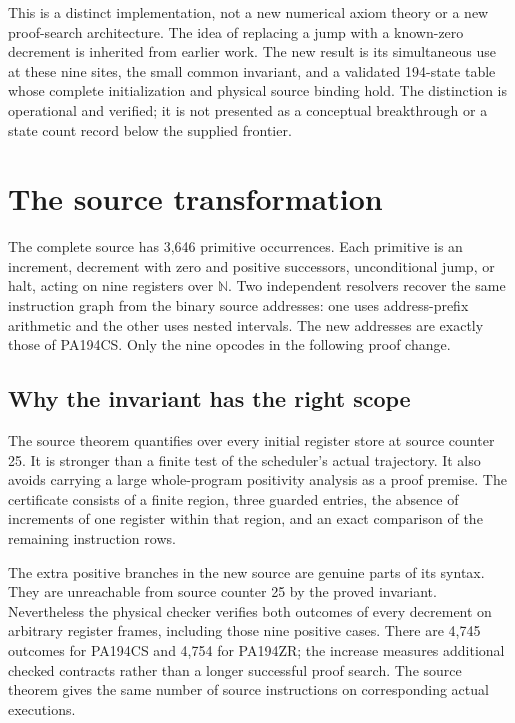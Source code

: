 \documentclass[11pt,letterpaper]{article}
\begin{document}
This is a distinct implementation, not a new numerical axiom theory or
a new proof-search architecture. The idea of replacing a jump with a
known-zero decrement is inherited from earlier work. The new result is
its simultaneous use at these nine sites, the small common invariant,
and a validated 194-state table whose complete initialization and
physical source binding hold. The distinction is operational and
verified; it is not presented as a conceptual breakthrough or a state
count record below the supplied frontier.



\section{The source transformation}
\label{sec:source}
The complete source has 3,646 primitive occurrences. Each primitive is
an increment, decrement with zero and positive successors, unconditional
jump, or halt, acting on nine registers over $\mathbb N$. Two independent
resolvers recover the same instruction graph from the binary source
addresses: one uses address-prefix arithmetic and the other uses nested
intervals. The new addresses are exactly those of PA194CS. Only the nine
opcodes in the following proof change.



\subsection{Why the invariant has the right scope}
The source theorem quantifies over every initial register store at source
counter 25. It is stronger than a finite test of the scheduler's actual
trajectory. It also avoids carrying a large whole-program positivity
analysis as a proof premise. The certificate consists of a finite region,
three guarded entries, the absence of increments of one register within
that region, and an exact comparison of the remaining instruction rows.

The extra positive branches in the new source are genuine parts of its
syntax. They are unreachable from source counter 25 by the proved
invariant. Nevertheless the physical checker verifies both outcomes of
every decrement on arbitrary register frames, including those nine
positive cases. There are 4,745 outcomes for PA194CS and 4,754 for PA194ZR;
the increase measures additional checked contracts rather than a longer
successful proof search. The source theorem gives the same number of
source instructions on corresponding actual executions.
\end{document}
